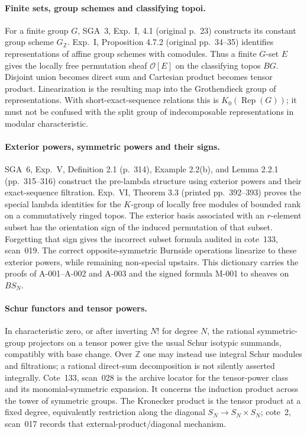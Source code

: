 \paragraph{Finite sets, group schemes and classifying topoi.}
For a finite group \(G\), SGA~3, Exp.~I, 4.1 (original p.~23) constructs its constant
group scheme \(G_{\mathbb Z}\).  Exp.~I, Proposition 4.7.2 (original pp.~34--35) identifies
representations of affine group schemes with comodules.
Thus a finite \(G\)-set \(E\) gives the locally free permutation
sheaf \(\mathcal O[E]\) on the classifying topos \(BG\).
Disjoint union becomes direct sum and Cartesian product becomes
tensor product.  Linearization is the resulting map into the
Grothendieck group of representations.  With short-exact-sequence
relations this is \(K_0(\operatorname{Rep}(G))\);
it must not be confused with the split group of indecomposable
representations in modular characteristic.

\paragraph{Exterior powers, symmetric powers and their signs.}
SGA~6, Exp.~V, Definition 2.1 (p.~314), Example 2.2(b), and Lemma 2.2.1 (pp.~315--316)
construct the pre-lambda structure using exterior powers and
their exact-sequence filtration.  Exp.~VI, Theorem 3.3
(printed pp.~392--393) proves the special lambda identities for
the \(K\)-group of locally free modules of bounded rank on a
commutatively ringed topos.  The exterior basis associated with
an \(r\)-element subset has the orientation sign of the induced
permutation of that subset.  Forgetting that sign gives the
incorrect subset formula audited in cote~133, scan~019.
The correct opposite-symmetric Burnside operations linearize to
these exterior powers, while remaining non-special upstairs.
This dictionary carries the proofs of A-001--A-002 and A-003 and the
signed formula M-001 to sheaves on \(BS_N\).

\paragraph{Schur functors and tensor powers.}
In characteristic zero, or after inverting \(N!\) for degree \(N\),
the rational symmetric-group projectors on a tensor power give
the usual Schur isotypic summands, compatibly with base change.
Over \(\mathbb Z\) one may instead use integral Schur modules and
filtrations; a rational direct-sum decomposition is not silently
asserted integrally.  Cote~133, scan~028 is the archive locator for
the tensor-power class and its monomial-symmetric expansion.
It concerns the induction product across the tower of symmetric
groups.  The Kronecker product is the tensor product at a fixed
degree, equivalently restriction along the diagonal
\(S_N\to S_N\times S_N\); cote~2, scan~017 records that
external-product/diagonal mechanism.

